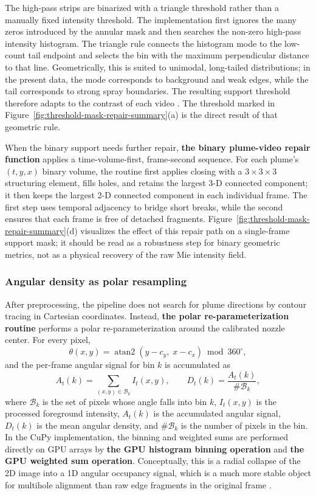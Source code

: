 \documentclass[english, 12pt, a4paper, elec, utf8, a-2b, online]{aaltothesis}
\begin{document}
The high-pass strips are binarized with a triangle threshold rather than a manually fixed intensity threshold. The implementation first ignores the many zeros introduced by the annular mask and then searches the non-zero high-pass intensity histogram. The triangle rule connects the histogram mode to the low-count tail endpoint and selects the bin with the maximum perpendicular distance to that line. Geometrically, this is suited to unimodal, long-tailed distributions; in the present data, the mode corresponds to background and weak edges, while the tail corresponds to strong spray boundaries. The resulting support threshold therefore adapts to the contrast of each video \cite{ZackRogersLatt1977}. The threshold marked in Figure~\ref{fig:threshold-mask-repair-summary}(a) is the direct result of that geometric rule.

When the binary support needs further repair, \textbf{the binary plume-video repair function} applies a time-volume-first, frame-second sequence. For each plume's \((t,y,x)\) binary volume, the routine first applies closing with a \(3\times3\times3\) structuring element, fills holes, and retains the largest 3-D connected component; it then keeps the largest 2-D connected component in each individual frame. The first step uses temporal adjacency to bridge short breaks, while the second ensures that each frame is free of detached fragments. Figure~\ref{fig:threshold-mask-repair-summary}(d) visualizes the effect of this repair path on a single-frame support mask; it should be read as a robustness step for binary geometric metrics, not as a physical recovery of the raw Mie intensity field.

\subsubsection{Angular density as polar resampling}

After preprocessing, the pipeline does not search for plume directions by contour tracing in Cartesian coordinates. Instead, \textbf{the polar re-parameterization routine} performs a polar re-parameterization around the calibrated nozzle center. For every pixel,
\[
\theta(x,y)=\operatorname{atan2}(y-c_y,\;x-c_x)\bmod 360^\circ,
\]
and the per-frame angular signal for bin \(k\) is accumulated as
\[
A_t(k)=\sum_{(x,y)\in \mathcal{B}_k} I_t(x,y), \qquad
D_t(k)=\frac{A_t(k)}{\#\mathcal{B}_k},
\]
where \(\mathcal{B}_k\) is the set of pixels whose angle falls into bin \(k\), \(I_t(x,y)\) is the processed foreground intensity, \(A_t(k)\) is the accumulated angular signal, \(D_t(k)\) is the mean angular density, and \(\#\mathcal{B}_k\) is the number of pixels in the bin. In the CuPy implementation, the binning and weighted sums are performed directly on GPU arrays by \textbf{the GPU histogram binning operation} and \textbf{the GPU weighted sum operation}. Conceptually, this is a radial collapse of the 2D image into a 1D angular occupancy signal, which is a much more stable object for multihole alignment than raw edge fragments in the original frame \cite{Szeliski2010Vision}.
\end{document}
